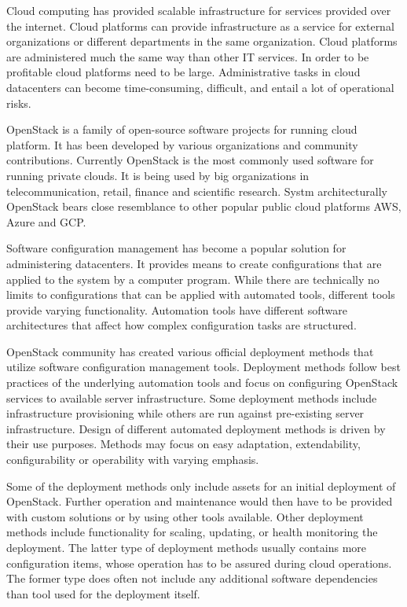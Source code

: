 \documentclass[officiallayout]{tktla}
\begin{document}
Cloud computing has provided scalable infrastructure for services provided over
the internet. Cloud platforms can provide infrastructure as a service for
external organizations or different departments in the same organization. Cloud
platforms are administered much the same way than other IT services. In order
to be profitable cloud platforms need to be large. Administrative tasks in
cloud datacenters can become time-consuming, difficult, and entail a lot of
operational risks.

OpenStack is a family of open-source software projects for running cloud
platform. It has been developed by various organizations and community
contributions. Currently OpenStack is the most commonly used software for
running private clouds. It is being used by big organizations in
telecommunication, retail, finance and scientific research. Systm
architecturally OpenStack bears close resemblance to other popular public cloud
platforms AWS, Azure and GCP.

Software configuration management has become a popular solution for
administering datacenters. It provides means to create configurations that are
applied to the system by a computer program. While there are technically no
limits to configurations that can be applied with automated tools, different
tools provide varying functionality. Automation tools have different software
architectures that affect how complex configuration tasks are structured.

OpenStack community has created various official deployment methods that
utilize software configuration management tools. Deployment methods follow best
practices of the underlying automation tools and focus on configuring OpenStack
services to available server infrastructure. Some deployment methods include
infrastructure provisioning while others are run against pre-existing server
infrastructure. Design of different automated deployment methods is driven by
their use purposes. Methods may focus on easy adaptation, extendability,
configurability or operability with varying emphasis.

Some of the deployment methods only include assets for an initial deployment of
OpenStack. Further operation and maintenance would then have to be provided
with custom solutions or by using other tools available. Other deployment
methods include functionality for scaling, updating, or health monitoring the
deployment. The latter type of deployment methods usually contains more
configuration items, whose operation has to be assured during cloud operations.
The former type does often not include any additional software dependencies
than tool used for the deployment itself.
\end{document}
